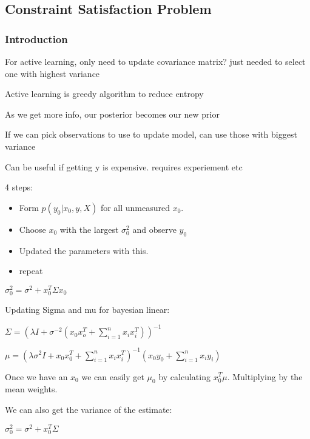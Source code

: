 \subsection{Constraint Satisfaction Problem}

\subsubsection{Introduction}

For active learning, only need to update covariance matrix? just needed to select one with highest variance


Active learning is greedy algorithm to reduce entropy


As we get more info, our posterior becomes our new prior


If we can pick observations to use  to update model, can use those with biggest variance

Can be useful if getting y is expensive. requires experiement etc


4 steps:

\begin{itemize}
\item Form \(p(y_0|x_0,y,X)\) for all unmeasured \(x_0\).
\item Choose \(x_0\) with the largest \(\sigma_0^2\) and observe \(y_0\)
\item Updated the parameters with this.
\item repeat
\end{itemize}

\(\sigma_0^2 =\sigma^2+x_0^T\Sigma x_0\)

Updating Sigma and mu for bayesian linear:

\(\Sigma = (\lambda I + \sigma^{-2}(x_0x_o^T+\sum_{i=1}^nx_ix_i^T))^{-1}\)

\(\mu = (\lambda \sigma^2I+ x_0x_0^T+\sum_{i=1}^nx_ix_i^T)^{-1}(x_0y_0+\sum_{i=1}^nx_iy_i)\)

Once we have  an \(x_0\) we can easily get \(\mu_0\) by calculating \(x_0^T\mu\). Multiplying by the mean weights.

We can also get the variance of the estimate:

\(\sigma^2_0=\sigma^2+x_0^T\Sigma \)

